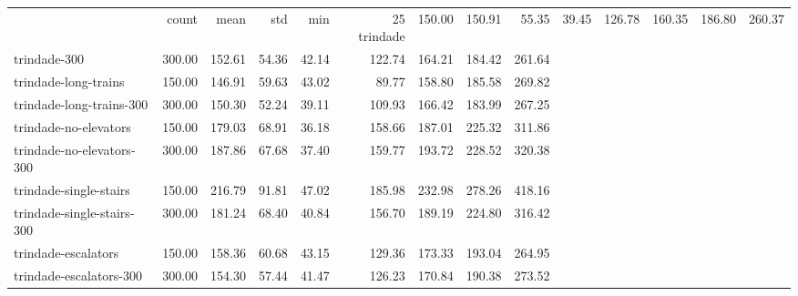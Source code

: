 \begin{tabular}{lrrrrrrrr}
 & count & mean & std & min & 25%
trindade & 150.00 & 150.91 & 55.35 & 39.45 & 126.78 & 160.35 & 186.80 & 260.37 \\
trindade-300 & 300.00 & 152.61 & 54.36 & 42.14 & 122.74 & 164.21 & 184.42 & 261.64 \\
trindade-long-trains & 150.00 & 146.91 & 59.63 & 43.02 & 89.77 & 158.80 & 185.58 & 269.82 \\
trindade-long-trains-300 & 300.00 & 150.30 & 52.24 & 39.11 & 109.93 & 166.42 & 183.99 & 267.25 \\
trindade-no-elevators & 150.00 & 179.03 & 68.91 & 36.18 & 158.66 & 187.01 & 225.32 & 311.86 \\
trindade-no-elevators-300 & 300.00 & 187.86 & 67.68 & 37.40 & 159.77 & 193.72 & 228.52 & 320.38 \\
trindade-single-stairs & 150.00 & 216.79 & 91.81 & 47.02 & 185.98 & 232.98 & 278.26 & 418.16 \\
trindade-single-stairs-300 & 300.00 & 181.24 & 68.40 & 40.84 & 156.70 & 189.19 & 224.80 & 316.42 \\
trindade-escalators & 150.00 & 158.36 & 60.68 & 43.15 & 129.36 & 173.33 & 193.04 & 264.95 \\
trindade-escalators-300 & 300.00 & 154.30 & 57.44 & 41.47 & 126.23 & 170.84 & 190.38 & 273.52 \\
\end{tabular}
